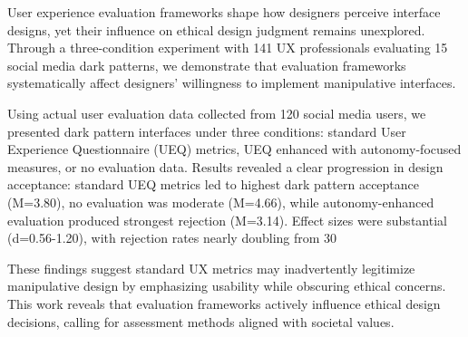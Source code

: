 
User experience evaluation frameworks shape how designers perceive interface designs, yet their influence on ethical design judgment remains unexplored. Through a three-condition experiment with 141 UX professionals evaluating 15 social media dark patterns, we demonstrate that evaluation frameworks systematically affect designers' willingness to implement manipulative interfaces.

Using actual user evaluation data collected from 120 social media users, we presented dark pattern interfaces under three conditions: standard User Experience Questionnaire (UEQ) metrics, UEQ enhanced with autonomy-focused measures, or no evaluation data. Results revealed a clear progression in design acceptance: standard UEQ metrics led to highest dark pattern acceptance (M=3.80), no evaluation was moderate (M=4.66), while autonomy-enhanced evaluation produced strongest rejection (M=3.14). Effect sizes were substantial (d=0.56-1.20), with rejection rates nearly doubling from 30%

These findings suggest standard UX metrics may inadvertently legitimize manipulative design by emphasizing usability while obscuring ethical concerns. This work reveals that evaluation frameworks actively influence ethical design decisions, calling for assessment methods aligned with societal values.

